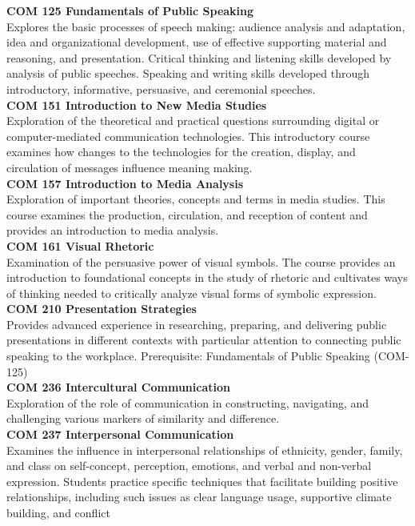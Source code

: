\documentclass[
  letterpaper,
]{scrbook}
\begin{document}
\textbf{COM 125 Fundamentals of Public Speaking}\\
Explores the basic processes of speech making: audience analysis and
adaptation, idea and organizational development, use of effective
supporting material and reasoning, and presentation. Critical thinking
and listening skills developed by analysis of public speeches. Speaking
and writing skills developed through introductory, informative,
persuasive, and ceremonial speeches.\\
\textbf{COM 151 Introduction to New Media Studies}\\
Exploration of the theoretical and practical questions surrounding
digital or computer-mediated communication technologies. This
introductory course examines how changes to the technologies for the
creation, display, and circulation of messages influence meaning
making.\\
\textbf{COM 157 Introduction to Media Analysis}\\
Exploration of important theories, concepts and terms in media studies.
This course examines the production, circulation, and reception of
content and provides an introduction to media analysis.\\
\textbf{COM 161 Visual Rhetoric}\\
Examination of the persuasive power of visual symbols. The course
provides an introduction to foundational concepts in the study of
rhetoric and cultivates ways of thinking needed to critically analyze
visual forms of symbolic expression.\\
\textbf{COM 210 Presentation Strategies}\\
Provides advanced experience in researching, preparing, and delivering
public presentations in different contexts with particular attention to
connecting public speaking to the workplace. Prerequisite: Fundamentals
of Public Speaking (COM-125)\\
\textbf{COM 236 Intercultural Communication}\\
Exploration of the role of communication in constructing, navigating,
and challenging various markers of similarity and difference.\\
\textbf{COM 237 Interpersonal Communication}\\
Examines the influence in interpersonal relationships of ethnicity,
gender, family, and class on self-concept, perception, emotions, and
verbal and non-verbal expression. Students practice specific techniques
that facilitate building positive relationships, including such issues
as clear language usage, supportive climate building, and conflict
\end{document}
